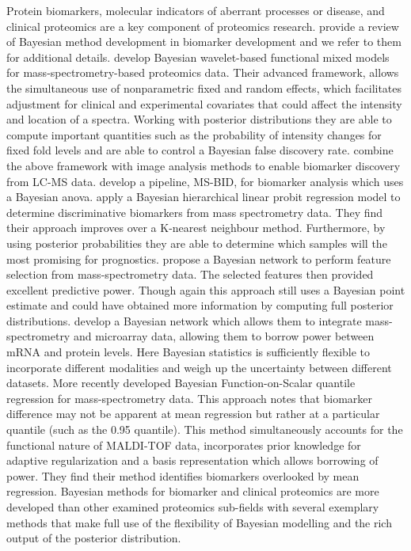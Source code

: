 \documentclass[12pt,english]{article}
\begin{document}
Protein biomarkers, molecular indicators of aberrant processes or disease, and clinical proteomics are a key component of proteomics research. \citet{Hernandez::2015} provide a review of Bayesian method development in biomarker development and we refer to them for additional details. \citet{Morris::2006, Morris::2008} develop Bayesian wavelet-based functional mixed models for mass-spectrometry-based proteomics data. Their advanced framework, allows the simultaneous use of nonparametric fixed and random effects, which facilitates adjustment for clinical and experimental covariates that could affect the intensity and location of a spectra. Working with posterior distributions they are able to compute important quantities such as the probability of intensity changes for fixed fold levels and are able to control a Bayesian false discovery rate. \citet{Liao::2014} combine the above framework with image analysis methods to enable biomarker discovery from LC-MS data. \citet{Hwang::2008} develop a pipeline, MS-BID, for biomarker analysis which uses a Bayesian anova. \citet{Harris::2009} apply a Bayesian hierarchical linear probit regression model to determine discriminative biomarkers from mass spectrometry data. They find their approach improves over a K-nearest neighbour method. Furthermore, by using posterior probabilities they are able to determine which samples will the most promising for prognostics. \citet{Kuschner::2010} propose a Bayesian network to perform feature selection from mass-spectrometry data. The selected features then provided excellent predictive power. Though again this approach still uses a Bayesian point estimate and could have obtained more information by computing full posterior distributions. \citet{Deng::2007} develop a Bayesian network which allows them to integrate mass-spectrometry and microarray data, allowing them to borrow power between mRNA and protein levels. Here Bayesian statistics is sufficiently flexible to incorporate different modalities and weigh up the uncertainty between different datasets. More recently \citet{Liu::2020} developed Bayesian Function-on-Scalar quantile regression for mass-spectrometry data. This approach notes that biomarker difference may not be apparent at mean regression but rather at a particular quantile (such as the 0.95 quantile). This method simultaneously accounts for the functional nature of MALDI-TOF data, incorporates prior knowledge for adaptive regularization and a basis representation which allows borrowing of power. They find their method identifies biomarkers overlooked by mean regression. Bayesian methods for biomarker and clinical proteomics are more developed than other examined proteomics sub-fields with several exemplary methods that make full use of the flexibility of Bayesian modelling and the rich output of the posterior distribution. 
\end{document}
